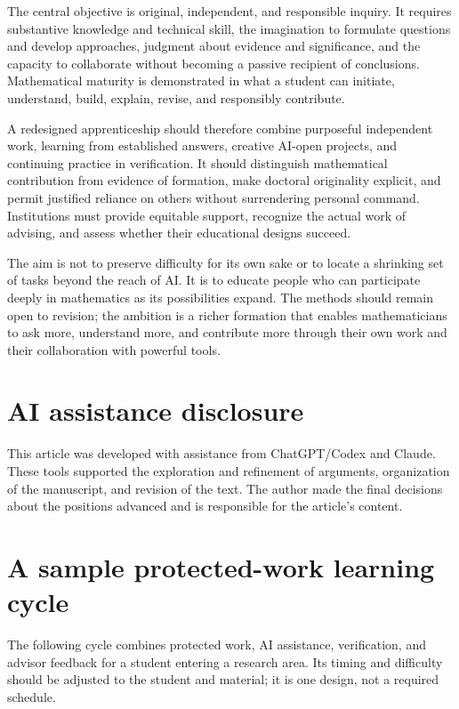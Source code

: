 \documentclass[11pt]{article}
\begin{document}
The central objective is original, independent, and responsible inquiry. It requires
substantive knowledge and technical skill, the imagination to formulate questions and
develop approaches, judgment about evidence and significance, and the capacity to
collaborate without becoming a passive recipient of conclusions. Mathematical maturity
is demonstrated in what a student can initiate, understand, build, explain, revise,
and responsibly contribute.

A redesigned apprenticeship should therefore combine purposeful independent work,
learning from established answers, creative AI-open projects, and continuing practice
in verification. It should distinguish mathematical contribution from evidence of
formation, make doctoral originality explicit, and permit justified reliance on others
without surrendering personal command. Institutions must provide equitable support,
recognize the actual work of advising, and assess whether their educational designs
succeed.

The aim is not to preserve difficulty for its own sake or to locate a shrinking set of
tasks beyond the reach of AI. It is to educate people who can participate deeply in
mathematics as its possibilities expand. The methods should remain open to revision;
the ambition is a richer formation that enables mathematicians to ask more, understand
more, and contribute more through their own work and their collaboration with powerful
tools.

\section*{AI assistance disclosure}
This article was developed with assistance from ChatGPT/Codex and Claude. These tools supported the exploration and refinement of arguments, organization of the manuscript, and revision of the text. The author made the final decisions about the positions advanced and is responsible for the article’s content.
\clearpage
\appendix
\small
\setlength{\parskip}{0.35em}

\section{A sample protected-work learning cycle}
\label{app:protected-work}

The following cycle combines protected work, AI assistance, verification, and advisor
feedback for a student entering a research area. Its timing and difficulty should be
adjusted to the student and material; it is one design, not a required schedule.
\end{document}
